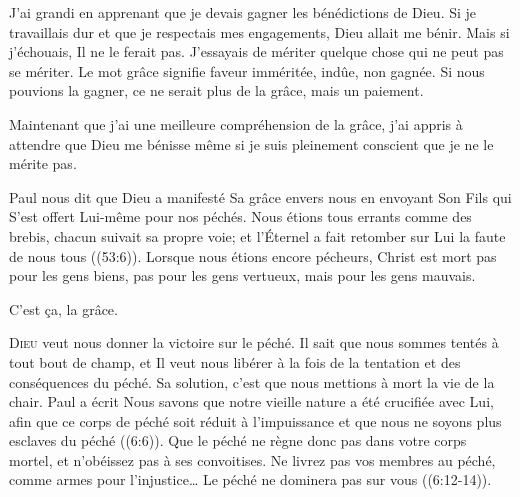 J'ai grandi en apprenant que je devais gagner les bénédictions de Dieu.
 Si je travaillais dur et que je respectais mes engagements,
 Dieu allait me bénir. Mais si j'échouais, Il ne le ferait pas.
 J'essayais de mériter quelque chose qui ne peut pas se mériter.
 Le mot \Og grâce \Fg{} signifie \Og faveur imméritée, indûe,
 non gagnée. \Fg{} Si nous pouvions la gagner,
 ce ne serait plus de la grâce, mais un paiement.


Maintenant que j'ai une meilleure compréhension de la grâce,
 j'ai appris à attendre que Dieu me bénisse même si je suis pleinement
 conscient que je ne le mérite pas.

Paul nous dit que Dieu a manifesté Sa grâce envers nous en envoyant Son Fils
 qui S'est offert Lui-même pour nos péchés.
 \Og Nous étions tous errants comme des brebis, chacun suivait sa propre voie;
 et l'Éternel a fait retomber sur Lui la faute de nous tous \Fg{}
 ((53:6)).
 Lorsque nous étions encore pécheurs, Christ est mort
 \ocadr pas pour les gens biens, pas pour les gens vertueux,
 mais pour les gens mauvais.

C'est \c{c}a,  la grâce.

\dvrule






\lettrine{D}{ieu} veut nous donner la victoire sur le péché.
 Il sait que nous sommes tentés à tout bout de champ,
 et Il veut nous libérer à la fois de la tentation et des conséquences
 du péché. Sa solution, c'est que nous mettions à mort la vie de la chair.
 Paul a écrit\frcolon{} 
 \Og Nous savons que notre vieille nature a été crucifiée avec Lui,
 afin que ce corps de péché soit réduit à l'impuissance
 et que nous ne soyons plus esclaves du péché \Fg{} ((6:6)).
 \Og Que le péché ne règne donc pas dans votre corps mortel,
 et n'obéissez pas à ses convoitises. Ne livrez pas vos membres au péché,
 comme armes pour l'injustice\dots{}
 Le péché ne dominera pas sur vous \Fg{} ((6:12-14)).

